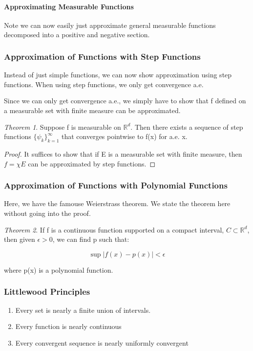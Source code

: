 \documentclass[class=article, crop=false]{standalone}
\theoremstyle{definition}
\theoremstyle{remark}
\theoremstyle{lemma}
\theoremstyle{theorem}
\newtheorem*{theorem}{Theorem}
\theoremstyle{corollary}
\theoremstyle{property}
\begin{document}
			\paragraph{Approximating Measurable Functions}
				Note we can now easily just approximate general measurable functions decomposed into a positive and negative section. 


		\subsubsection{Approximation of Functions with Step Functions}
			Instead of just simple functions, we can now show approximation using step functions. When using step functions, we only get convergence a.e. 

			Since we can only get convergence a.e., we simply have to show that f defined on a measurable set with finite measure can be approximated.

			\begin{theorem}
			\label{thm:approx_with_stepfuncs}
				Suppose f is measurable on $\mathbb{R}^d$. Then there exists a sequence of step functions $\{\psi_k\}_{k=1}^\infty$ that converges pointwise to f(x) for a.e. x.
			\end{theorem}
			\begin{proof}
				It suffices to show that if E is a measurable set with finite measure, then $f = \chi E$ can be approximated by step functions. 


			\end{proof}

		\subsubsection{Approximation of Functions with Polynomial Functions}
			Here, we have the famouse Weierstrass theorem. We state the theorem here without going into the proof.

			\begin{theorem}
			\label{thm:weirstrass_approx}
				If f is a continuous function supported on a compact interval, $C \subset \mathbb{R}^d$, then given $\epsilon > 0$, we can find p such that:

					$$\sup | f(x) - p(x) | < \epsilon$$

				where p(x) is a polynomial function.
			\end{theorem}


		\subsubsection{Littlewood Principles}
			\label{ssub:littlewood_principles}
			\begin{enumerate}
				\item Every set is nearly a finite union of intervals.
				\item Every function is nearly continuous
				\item Every convergent sequence is nearly uniformly convergent
			\end{enumerate}
\end{document}
